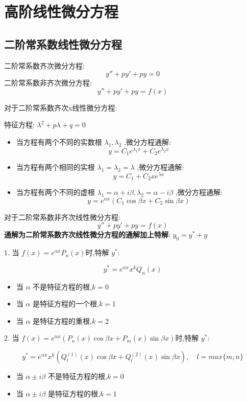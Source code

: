 \section{高阶线性微分方程}
\subsection{二阶常系数线性微分方程}
\begin{definition}[二阶常系数线性微分方程]
	二阶常系数齐次微分方程:
	$$y''+py'+py=0$$
	二阶常系数非齐次微分方程:
	$$y''+py'+py=f(x)$$
\end{definition}
\begin{theorem}[二阶常系数齐次线性微分方程解]\label{the: 齐次二阶常系数线性微分方程}
	对于二阶常系数齐次x线性微分方程:

	特征方程:  $\lambda^{2}+p\lambda+q=0$

	\begin{itemize}
		\item 当方程有两个不同的实数根 $\lambda_{1},\lambda_{2}$ ,微分方程通解: $$y=C_{1}e^{\lambda_{1} x}+C_{2}e^{\lambda_{2}x}$$
		\item 当方程有两个相同的实根 $\lambda_{1}=\lambda_{2}=\lambda$ ,微分方程通解: $$y=C_{1}+C_{2}xe^{\lambda x}$$
		\item 当方程有两个不同的虚根 $\lambda_{1}=\alpha +i\beta,\lambda_{2}=\alpha-i\beta$ ,微分方程通解: $$y=e^{\alpha x}(C_{1}\cos \beta x+C_{2}\sin \beta x)$$
	\end{itemize}
\end{theorem}
\begin{theorem}[二阶常系数非齐次线性微分方程解]
	对于二阶常系数非齐次线性微分方程:
	$$y''+py'+py=f(x)$$
	\textbf{通解为二阶常系数齐次线性微分方程的通解加上特解}: $y_{0}=y^{*}+y$

	1. 当 $f(x)=e^{\alpha x}P_{n}(x)$时,特解 $y^{*}$:

	$$y^{*}=e^{\alpha x}x^{k}Q_{n}(x)$$
	\begin{itemize}
		\item 当 $\alpha$ 不是特征方程的根,$k=0$
		\item 当 $\alpha$ 是特征方程的一个根,$k=1$
		\item 当 $\alpha$ 是特征方程的重根,$k=2$
	\end{itemize}

	2. 当 $f(x)=e^{\alpha x}(P_{n}(x)\cos \beta x+P_{m}(x)\sin \beta x)$时,特解 $y^{*}$:

	$$y^{*}=e^{\alpha x}x^{k}(Q_{l}^{(1)}(x)\cos \beta x+Q_{l}^{(2)}(x)\sin \beta x),\quad l=max\{m,n\}$$
	\begin{itemize}
		\item 当 $\alpha\pm i\beta$ 不是特征方程的根,$k=0$
		\item 当 $\alpha\pm i\beta$ 是特征方程的根,$k=1$
	\end{itemize}
\end{theorem}

